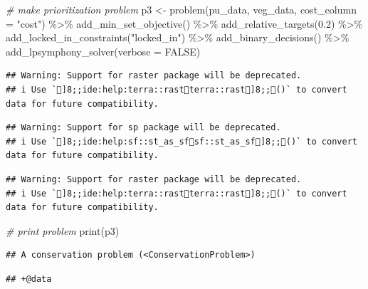 \documentclass[
  12pt,
]{book}
\newenvironment{Shaded}{\begin{snugshade}}{\end{snugshade}}
\newcommand{\AttributeTok}[1]{\textcolor[rgb]{0.77,0.63,0.00}{#1}}
\newcommand{\CommentTok}[1]{\textcolor[rgb]{0.56,0.35,0.01}{\textit{#1}}}
\newcommand{\ConstantTok}[1]{\textcolor[rgb]{0.00,0.00,0.00}{#1}}
\newcommand{\FloatTok}[1]{\textcolor[rgb]{0.00,0.00,0.81}{#1}}
\newcommand{\FunctionTok}[1]{\textcolor[rgb]{0.00,0.00,0.00}{#1}}
\newcommand{\NormalTok}[1]{#1}
\newcommand{\OtherTok}[1]{\textcolor[rgb]{0.56,0.35,0.01}{#1}}
\newcommand{\SpecialCharTok}[1]{\textcolor[rgb]{0.00,0.00,0.00}{#1}}
\newcommand{\StringTok}[1]{\textcolor[rgb]{0.31,0.60,0.02}{#1}}
\begin{document}
\begin{Shaded}
\begin{Highlighting}[]
\CommentTok{\# make prioritization problem}
\NormalTok{p3 }\OtherTok{\textless{}{-}} \FunctionTok{problem}\NormalTok{(pu\_data, veg\_data, }\AttributeTok{cost\_column =} \StringTok{"cost"}\NormalTok{) }\SpecialCharTok{\%\textgreater{}\%}
      \FunctionTok{add\_min\_set\_objective}\NormalTok{() }\SpecialCharTok{\%\textgreater{}\%}
      \FunctionTok{add\_relative\_targets}\NormalTok{(}\FloatTok{0.2}\NormalTok{) }\SpecialCharTok{\%\textgreater{}\%}
      \FunctionTok{add\_locked\_in\_constraints}\NormalTok{(}\StringTok{"locked\_in"}\NormalTok{) }\SpecialCharTok{\%\textgreater{}\%}
      \FunctionTok{add\_binary\_decisions}\NormalTok{() }\SpecialCharTok{\%\textgreater{}\%}
      \FunctionTok{add\_lpsymphony\_solver}\NormalTok{(}\AttributeTok{verbose =} \ConstantTok{FALSE}\NormalTok{)}
\end{Highlighting}
\end{Shaded}

\begin{verbatim}
## Warning: Support for raster package will be deprecated.
## i Use `]8;;ide:help:terra::rastterra::rast]8;;()` to convert data for future compatibility.
\end{verbatim}

\begin{verbatim}
## Warning: Support for sp package will be deprecated.
## i Use `]8;;ide:help:sf::st_as_sfsf::st_as_sf]8;;()` to convert data for future compatibility.
\end{verbatim}

\begin{verbatim}
## Warning: Support for raster package will be deprecated.
## i Use `]8;;ide:help:terra::rastterra::rast]8;;()` to convert data for future compatibility.
\end{verbatim}

\begin{Shaded}
\begin{Highlighting}[]
\CommentTok{\# print problem}
\FunctionTok{print}\NormalTok{(p3)}
\end{Highlighting}
\end{Shaded}

\begin{verbatim}
## A conservation problem (<ConservationProblem>)
\end{verbatim}

\begin{verbatim}
## +@data
\end{verbatim}
\end{document}
